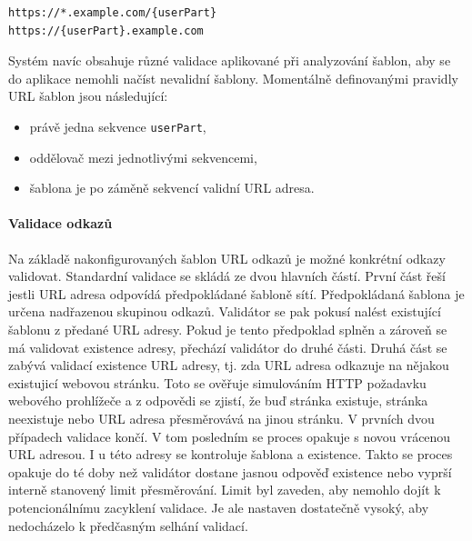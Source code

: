 			\begin{lstlisting}[caption={Ukázka šablon URL adres. Zdroj: [autor]}]
https://*.example.com/{userPart}
https://{userPart}.example.com
			\end{lstlisting}

			Systém navíc obsahuje různé validace aplikované při analyzování šablon, aby se do aplikace nemohli načíst
			nevalidní šablony.
			Momentálně definovanými pravidly URL šablon jsou následující:
			\begin{itemize}
				\item právě jedna sekvence \lstinline{userPart},
				\item oddělovač mezi jednotlivými sekvencemi,
				\item šablona je po záměně sekvencí validní URL adresa.
			\end{itemize}

			\paragraph{Validace odkazů}

			Na základě nakonfigurovaných šablon URL odkazů je možné konkrétní odkazy validovat.
			Standardní validace se skládá ze dvou hlavních částí.
			První část řeší jestli \ac{URL} adresa odpovídá předpokládané šabloně sítí.
			Předpokládaná šablona je určena nadřazenou skupinou odkazů.
			Validátor se pak pokusí nalést existující šablonu z předané URL adresy.
			Pokud je tento předpoklad splněn a zároveň se má validovat existence adresy, přechází validátor do druhé části.
			Druhá část se zabývá validací existence \ac{URL} adresy, tj. zda URL adresa odkazuje na nějakou existujicí
			webovou stránku.
			Toto se ověřuje simulováním \ac{HTTP} požadavku webového prohlížeče a z odpovědi se zjistí, že buď stránka
			existuje, stránka neexistuje nebo URL adresa přesměrovává na jinou stránku.
			V prvních dvou případech validace končí.
			V tom posledním se proces opakuje s novou vrácenou URL adresou.
			I u této adresy se kontroluje šablona a existence.
			Takto se proces opakuje do té doby než validátor dostane jasnou odpověď existence nebo vyprší interně stanovený
			limit přesměrování.
			Limit byl zaveden, aby nemohlo dojít k potencionálnímu zacyklení validace.
			Je ale nastaven dostatečně vysoký, aby nedocházelo k předčasným selhání validací.

